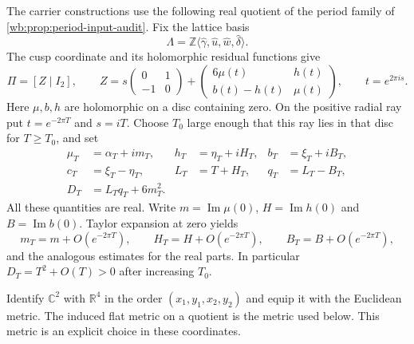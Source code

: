 The carrier constructions use the following real quotient of the period
family of \cref{wb:prop:period-input-audit}.  Fix the lattice basis
\[
 \Lambda=\mathbb Z\langle\widehat\gamma,\widehat u,
                         \widehat w,\widehat\delta\rangle.
\]
The cusp coordinate and its holomorphic residual functions give
\[
 \Pi=[Z\mid I_2],\qquad
 Z=s\begin{pmatrix}0&1\\-1&0\end{pmatrix}
       +\begin{pmatrix}6\mu(t)&h(t)\\b(t)-h(t)&\mu(t)\end{pmatrix},
 \qquad t=e^{2\pi i s}.
\]
Here $\mu,b,h$ are holomorphic on a disc containing zero.  On the positive
radial ray put $t=e^{-2\pi T}$ and $s=iT$.  Choose $T_0$ large enough that
this ray lies in that disc for $T\geq T_0$, and set
\begin{equation}
 \begin{aligned}
 \mu_T&=\alpha_T+im_T,& h_T&=\eta_T+iH_T,& b_T&=\xi_T+iB_T,\\
 c_T&=\xi_T-\eta_T,& L_T&=T+H_T,& q_T&=L_T-B_T,\\
 D_T&=L_Tq_T+6m_T^2.
 \end{aligned}
 \label{wb:cusp-spec-radial-notation}
\end{equation}
All these quantities are real.  Write
$m=\operatorname{Im}\mu(0)$, $H=\operatorname{Im}h(0)$ and
$B=\operatorname{Im}b(0)$.  Taylor expansion at zero yields
\begin{equation}
 m_T=m+O(e^{-2\pi T}),\qquad
 H_T=H+O(e^{-2\pi T}),\qquad
 B_T=B+O(e^{-2\pi T}),
 \label{wb:cusp-spec-holomorphic-errors}
\end{equation}
and the analogous estimates for the real parts.  In particular
$D_T=T^2+O(T)>0$ after increasing $T_0$.

Identify $\mathbb C^2$ with $\mathbb R^4$ in the order
$(x_1,y_1,x_2,y_2)$ and equip it with the Euclidean metric.  The induced
flat metric on a quotient is the metric used below.  This metric is an
explicit choice in these coordinates.

